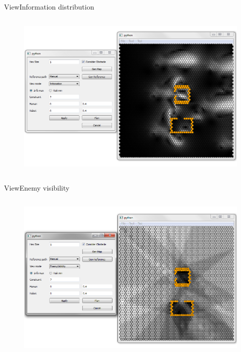 \begin{frame}{View}{Information distribution}

\begin{columns}
\begin{figure}
\centering
\includegraphics[width = \textwidth]{./screenshot/information_view.png}
\end{figure}

\begin{minipage}{\textwidth}
\end{minipage}
\end{columns}

\end{frame}

\begin{frame}{View}{Enemy visibility}

\begin{columns}
\begin{figure}
\centering
\includegraphics[width = \textwidth]{./screenshot/enemy_visibility_view.png}
\end{figure}

\begin{minipage}{\textwidth}
\end{minipage}
\end{columns}

\end{frame}

